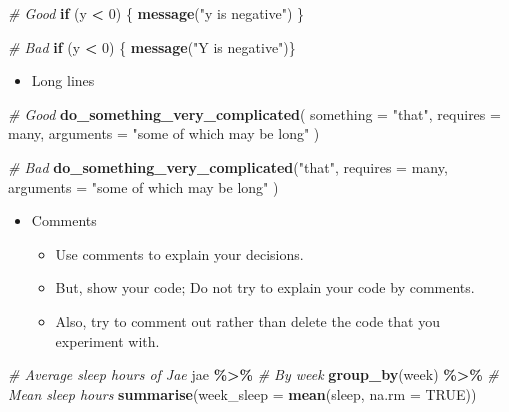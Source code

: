 \documentclass[
]{book}
\newenvironment{Shaded}{\begin{snugshade}}{\end{snugshade}}
\newcommand{\CommentTok}[1]{\textcolor[rgb]{0.56,0.35,0.01}{\textit{#1}}}
\newcommand{\ControlFlowTok}[1]{\textcolor[rgb]{0.13,0.29,0.53}{\textbf{#1}}}
\newcommand{\DataTypeTok}[1]{\textcolor[rgb]{0.13,0.29,0.53}{#1}}
\newcommand{\DecValTok}[1]{\textcolor[rgb]{0.00,0.00,0.81}{#1}}
\newcommand{\KeywordTok}[1]{\textcolor[rgb]{0.13,0.29,0.53}{\textbf{#1}}}
\newcommand{\NormalTok}[1]{#1}
\newcommand{\OperatorTok}[1]{\textcolor[rgb]{0.81,0.36,0.00}{\textbf{#1}}}
\newcommand{\OtherTok}[1]{\textcolor[rgb]{0.56,0.35,0.01}{#1}}
\newcommand{\StringTok}[1]{\textcolor[rgb]{0.31,0.60,0.02}{#1}}
\providecommand{\tightlist}{%
  \setlength{\itemsep}{0pt}\setlength{\parskip}{0pt}}
\begin{document}
\begin{Shaded}
\begin{Highlighting}[]
\CommentTok{\# Good}
\ControlFlowTok{if}\NormalTok{ (y }\OperatorTok{<}\StringTok{ }\DecValTok{0}\NormalTok{) \{}
  \KeywordTok{message}\NormalTok{(}\StringTok{"y is negative"}\NormalTok{)}
\NormalTok{\}}

\CommentTok{\# Bad}
\ControlFlowTok{if}\NormalTok{ (y }\OperatorTok{<}\StringTok{ }\DecValTok{0}\NormalTok{) \{}
\KeywordTok{message}\NormalTok{(}\StringTok{"Y is negative"}\NormalTok{)\}}
\end{Highlighting}
\end{Shaded}

\begin{itemize}
\tightlist
\item
  Long lines
\end{itemize}

\begin{Shaded}
\begin{Highlighting}[]
\CommentTok{\# Good}
\KeywordTok{do\_something\_very\_complicated}\NormalTok{(}
  \DataTypeTok{something =} \StringTok{"that"}\NormalTok{,}
  \DataTypeTok{requires =}\NormalTok{ many,}
  \DataTypeTok{arguments =} \StringTok{"some of which may be long"}
\NormalTok{)}

\CommentTok{\# Bad}
\KeywordTok{do\_something\_very\_complicated}\NormalTok{(}\StringTok{"that"}\NormalTok{, }\DataTypeTok{requires =}\NormalTok{ many, }\DataTypeTok{arguments =}
                              \StringTok{"some of which may be long"}
\NormalTok{                              )}
\end{Highlighting}
\end{Shaded}

\begin{itemize}
\tightlist
\item
  Comments

  \begin{itemize}
  \tightlist
  \item
    Use comments to explain your decisions.
  \item
    But, show your code; Do not try to explain your code by comments.
  \item
    Also, try to comment out rather than delete the code that you experiment with.
  \end{itemize}
\end{itemize}

\begin{Shaded}
\begin{Highlighting}[]
\CommentTok{\# Average sleep hours of Jae}
\NormalTok{jae }\OperatorTok{\%>\%}
\StringTok{  }\CommentTok{\# By week}
\StringTok{  }\KeywordTok{group\_by}\NormalTok{(week) }\OperatorTok{\%>\%}
\StringTok{  }\CommentTok{\# Mean sleep hours }
\StringTok{  }\KeywordTok{summarise}\NormalTok{(}\DataTypeTok{week\_sleep =} \KeywordTok{mean}\NormalTok{(sleep, }\DataTypeTok{na.rm =} \OtherTok{TRUE}\NormalTok{))}
\end{Highlighting}
\end{Shaded}
\end{document}
